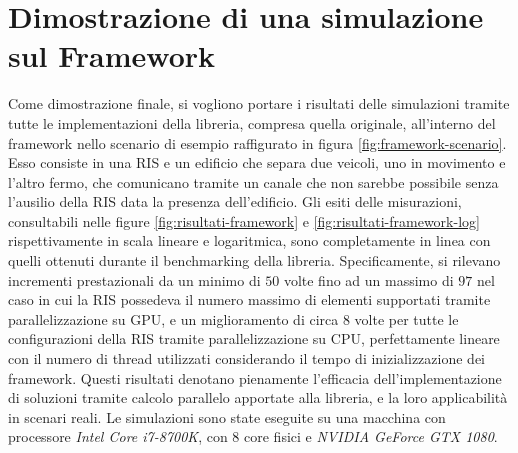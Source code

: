 \section{Dimostrazione di una simulazione sul Framework}
\label{sec:dimostrazione}

Come dimostrazione finale, si vogliono portare i risultati delle simulazioni tramite
tutte le implementazioni della libreria, compresa quella originale, all'interno del
framework nello scenario di esempio raffigurato in figura \ref{fig:framework-scenario}.
Esso consiste in una RIS e un edificio che separa due veicoli, uno in movimento e
l'altro fermo, che comunicano tramite un canale che non sarebbe possibile senza
l'ausilio della RIS data la presenza dell'edificio. Gli esiti delle misurazioni,
consultabili nelle figure \ref{fig:risultati-framework} e
\ref{fig:risultati-framework-log} rispettivamente in scala lineare e logaritmica,
sono completamente in linea con quelli ottenuti durante il benchmarking della libreria.
Specificamente, si rilevano incrementi prestazionali da un minimo di $50$ volte fino
ad un massimo di $97$ nel caso in cui la RIS possedeva il numero massimo di elementi
supportati tramite parallelizzazione su GPU, e un miglioramento di circa $8$
volte per tutte le configurazioni della RIS tramite parallelizzazione su CPU, perfettamente
lineare con il numero di thread utilizzati considerando il tempo di inizializzazione
dei framework. Questi risultati denotano pienamente l'efficacia dell'implementazione
di soluzioni tramite calcolo parallelo apportate alla libreria, e la loro applicabilità
in scenari reali. Le simulazioni sono state eseguite su una macchina con
processore \textit{Intel Core i7-8700K}, con $8$ core fisici e \textit{NVIDIA
GeForce GTX 1080}.

